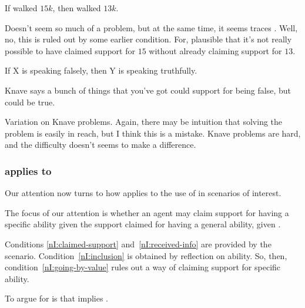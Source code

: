 \begin{note}[Problematic]
  \begin{scenario}
    If walked \(15k\), then walked \(13k\).
  \end{scenario}
  Doesn't seem so much of a problem, but at the same time, it seems \RBV{} traces \incl{}.
  Well, no, this is ruled out by some earlier condition.
  For, plausible that it's not really possible to have claimed support for \(15\) without already claiming support for \(13\).
\end{note}

\begin{note}[Knaves]
  \begin{scenario}
    If X is speaking falsely, then Y is speaking truthfully.

    Knave says a bunch of things that you've got could support for being false, but could be true.
  \end{scenario}
  Variation on Knave problems.
  Again, there may be intuition that solving the problem is easily in reach, but I think this is a mistake.
  Knave problems are hard, and the difficulty doesn't seems to make a difference.
\end{note}

\newpage

\subsubsection{\nI{} applies to \AR{}}
\label{sec:ni-applies-ar}

\begin{note}
  Our attention now turns to how \nI{} applies to the use of \aben{} in scenarios of interest.

  The focus of our attention is whether an agent may claim support for having a specific ability given the support claimed for having a general ability, given \gsi{}.
\end{note}

\begin{note}
  Conditions \ref{nI:claimed-support} and~\ref{nI:received-info} are provided by the scenario.
  Condition~\ref{nI:inclusion} is obtained by reflection on ability.
  So, then, condition~\ref{nI:going-by-value} rules out a way of claiming support for specific ability.

  To argue for is that \AR{} implies \RBV{}.
\end{note}

